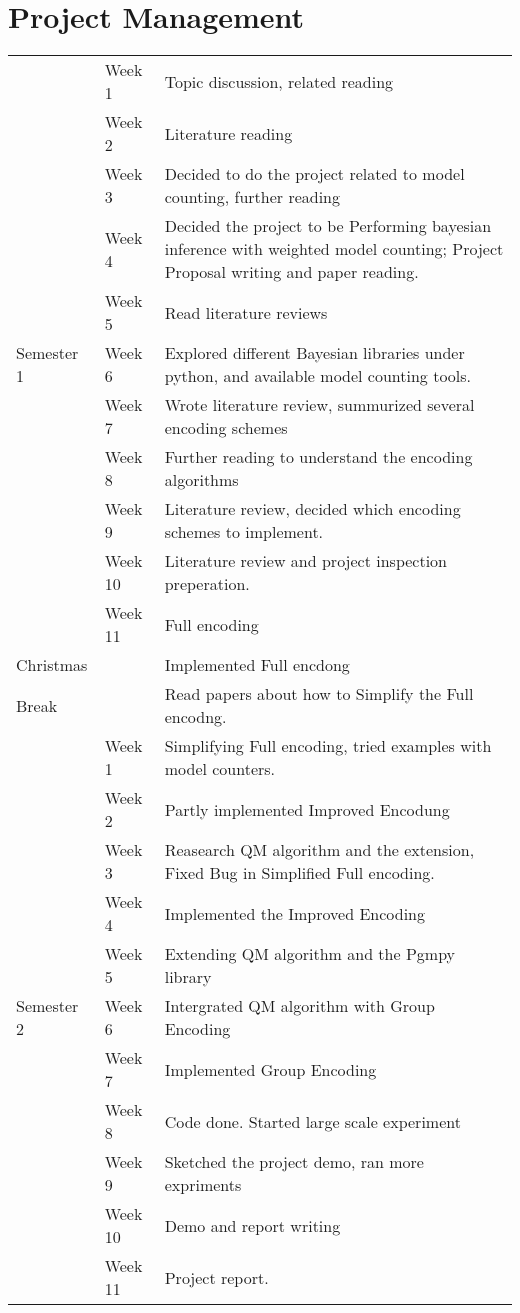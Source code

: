 \newpage
\section{Project Management}

    \begin{tabular}{l | l | p{80mm}}
    \hline
    \hline
    &	Week 1 	&	Topic discussion, related reading	\\
	&	Week 2	&	Literature reading	\\
	&	Week 3	&	Decided to do the project related to model counting, further reading	\\
	&	Week 4	&	Decided the project to be Performing bayesian inference with weighted model counting;  Project Proposal writing and paper reading.	\\
	&	Week 5	&	Read literature reviews	\\
Semester 1	&	Week 6	&	Explored different Bayesian libraries under python, and available model counting tools.	\\
	&	Week 7	&	Wrote literature review, summurized several encoding schemes	\\
	&	Week 8	&	Further reading to understand the encoding algorithms	\\
	&	Week 9	&	Literature review, decided which encoding schemes to implement.	\\
	&	Week 10	&	Literature review and project inspection preperation.	\\
	&	Week 11	&	Full encoding	\\
	\hline
Christmas	&		&	Implemented Full encdong	\\
Break	&		&	Read papers about how to Simplify the Full encodng.	\\
	\hline
	&	Week 1 	&	Simplifying Full encoding, tried examples with model counters.	\\
	&	Week 2	&	Partly implemented Improved Encodung	\\
	&	Week 3	&	Reasearch QM algorithm and the extension, Fixed Bug in Simplified Full encoding.	\\
	&	Week 4	&	Implemented the Improved Encoding	\\
	&	Week 5	&	Extending QM algorithm and the Pgmpy library	\\
Semester 2	&	Week 6	&	Intergrated QM algorithm with Group Encoding	\\
	&	Week 7	&	Implemented Group Encoding	\\
	&	Week 8	&	Code done.  Started large scale experiment	\\
	&	Week 9	&	Sketched the project demo, ran more expriments	\\
	&	Week 10	&	Demo and report writing	\\
	&	Week 11	&	Project report.	\\
	\hline
	\hline
\end{tabular}


